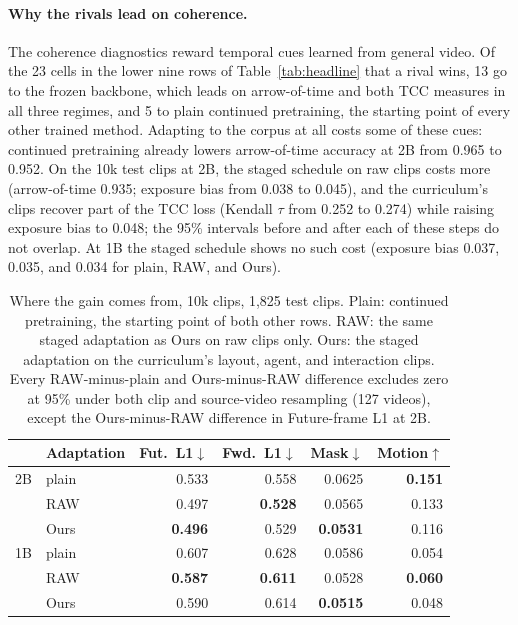 \paragraph{Why the rivals lead on coherence.} The coherence diagnostics reward temporal cues learned from general video. Of the 23 cells in the lower nine rows of Table~\ref{tab:headline} that a rival wins, 13 go to the frozen backbone, which leads on arrow-of-time and both TCC measures in all three regimes, and 5 to plain continued pretraining, the starting point of every other trained method. Adapting to the corpus at all costs some of these cues: continued pretraining already lowers arrow-of-time accuracy at 2B from 0.965 to 0.952. On the 10k test clips at 2B, the staged schedule on raw clips costs more (arrow-of-time 0.935; exposure bias from 0.038 to 0.045), and the curriculum's clips recover part of the TCC loss (Kendall $\tau$ from 0.252 to 0.274) while raising exposure bias to 0.048; the 95\% intervals before and after each of these steps do not overlap. At 1B the staged schedule shows no such cost (exposure bias 0.037, 0.035, and 0.034 for plain, RAW, and Ours).

\begin{table}[t]
\centering
\small
\setlength{\tabcolsep}{3pt}
\begin{tabular}{llrrrr}
\toprule
 & Adaptation & Fut.\ L1$\downarrow$ & Fwd.\ L1$\downarrow$ & Mask$\downarrow$ & Motion$\uparrow$ \\
\midrule
2B & plain & 0.533 & 0.558 & 0.0625 & \textbf{0.151} \\
 & RAW & 0.497 & \textbf{0.528} & 0.0565 & 0.133 \\
 & Ours & \textbf{0.496} & 0.529 & \textbf{0.0531} & 0.116 \\
\midrule
1B & plain & 0.607 & 0.628 & 0.0586 & 0.054 \\
 & RAW & \textbf{0.587} & \textbf{0.611} & 0.0528 & \textbf{0.060} \\
 & Ours & 0.590 & 0.614 & \textbf{0.0515} & 0.048 \\
\bottomrule
\end{tabular}
\caption{Where the gain comes from, 10k clips, 1,825 test clips. Plain: continued pretraining, the starting point of both other rows. RAW: the same staged adaptation as Ours on raw clips only. Ours: the staged adaptation on the curriculum's layout, agent, and interaction clips. Every RAW-minus-plain and Ours-minus-RAW difference excludes zero at 95\% under both clip and source-video resampling (127 videos), except the Ours-minus-RAW difference in Future-frame L1 at 2B.}
\label{tab:ladder}
\end{table}

